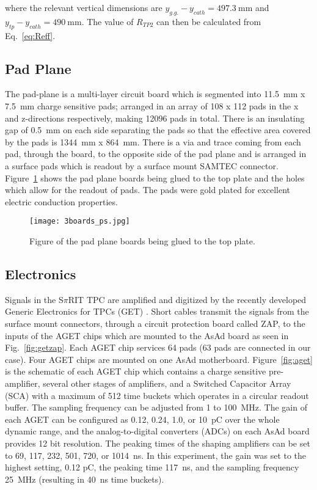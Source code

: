 where the relevant vertical dimensions are $y_{g.g.} - y_{cath} = \SI{497.3}{\milli\metre}$ and $y_{tp} - y_{cath} = \SI{490}{\milli\metre}$. The value of $R_{TP2}$ can then be calculated from Eq.~\ref{eq:Reff}.


\subsection{Pad Plane}
The pad-plane is a multi-layer circuit board which is segmented into \SI{11.5}{\milli\metre} x \SI{7.5}{\milli\metre} charge sensitive pads; arranged in an array of 108 x 112 pads in the x and z-directions respectively, making 12096 pads in total. There is an insulating gap of \SI{0.5}{\milli\metre} on each side separating the pads so that the effective area covered by the pads is \SI{1344}{\milli\metre} x \SI{864}{\milli\metre}. There is a via and trace coming from each pad, through the board, to the opposite side of the pad plane and is arranged in a surface pads which is readout by a surface mount SAMTEC connector. Figure~\ref{fig:padplane} shows the pad plane boards being glued to the top plate and the holes which allow for the readout of pads. The pads were gold plated for excellent electric conduction properties. 

\begin{figure}[!htb]
\centering
\texttt{[image: 3boards\_ps.jpg]}
\caption{Figure of the pad plane boards being glued to the top plate. }
\label{fig:padplane}
\end{figure}


\subsection{Electronics}

Signals in the S$\pi$RIT TPC are amplified and digitized by the recently developed Generic Electronics for TPCs (GET) \cite{get}.  Short cables transmit the signals from the surface mount connectors, through a circuit protection board called ZAP, to the inputs of the AGET chips which are mounted to the AsAd board as seen in Fig.~\ref{fig:getzap}. Each AGET chip services 64 pads (63 pads are connected in our case). Four AGET chips are mounted on one AsAd  motherboard. Figure~\ref{fig:aget} is the schematic of each  AGET chip which contains a charge sensitive pre-amplifier, several other stages of amplifiers, and a Switched Capacitor Array (SCA) with a maximum of 512 time buckets which operates in a circular readout buffer. The sampling frequency can be adjusted from 1 to \SI{100}{\mega\hertz}. The gain of each AGET can be configured as 0.12, 0.24, 1.0, or \SI{10}{\pico\coulomb} over the whole dynamic range, and the analog-to-digital converters (ADCs) on each AsAd board provides 12 bit resolution. The peaking times of the shaping amplifiers can be set to 69, 117, 232, 501, 720, or \SI{1014}{\nano\second}. In this experiment, the gain was set to the highest setting, 0.12 \si{\pico\coulomb}, the peaking time \SI{117}{\nano\second}, and the sampling frequency \SI{25}{\mega\hertz} (resulting in \SI{40}{\nano\second} time buckets). 

